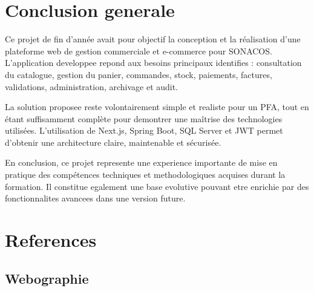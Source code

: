 \documentclass[12pt,a4paper]{report}
\begin{document}
\chapter*{Conclusion generale}

Ce projet de fin d'année avait pour objectif la conception et la réalisation d'une plateforme web de gestion commerciale et e-commerce pour SONACOS. L'application developpee repond aux besoins principaux identifies : consultation du catalogue, gestion du panier, commandes, stock, paiements, factures, validations, administration, archivage et audit.

La solution proposee reste volontairement simple et realiste pour un PFA, tout en étant suffisamment complète pour demontrer une maîtrise des technologies utilisées. L'utilisation de Next.js, Spring Boot, SQL Server et JWT permet d'obtenir une architecture claire, maintenable et sécurisée.

En conclusion, ce projet represente une experience importante de mise en pratique des compétences techniques et methodologiques acquises durant la formation. Il constitue egalement une base evolutive pouvant etre enrichie par des fonctionnalites avancees dans une version future.

\chapter*{References}

\section*{Webographie}
\end{document}
